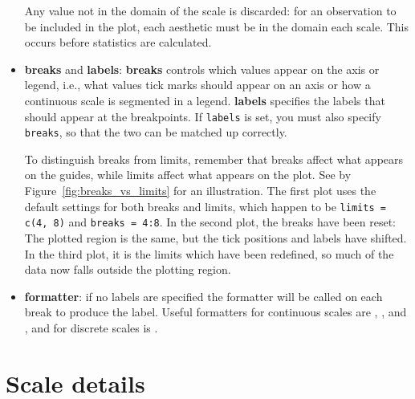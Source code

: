 \begin{itemize}
  Any value not in the domain of the scale is discarded: for an observation to be included in the plot, each aesthetic must be in the domain each scale.  This occurs before statistics are calculated. 
  
  \item {\bf breaks} and {\bf labels}: {\bf breaks} controls which values appear on the axis or legend, i.e., what values tick marks should appear on an axis or how a continuous scale is segmented in a legend. {\bf labels} specifies the labels that should appear at the breakpoints. If {\tt labels} is set, you must also specify {\tt breaks}, so that the two can be matched up correctly.

  To distinguish breaks from limits, remember that breaks affect what appears on the guides, while limits affect what appears on the plot.  See by Figure~\ref{fig:breaks_vs_limits} for an illustration.  The first plot uses the default settings for both breaks and limits, which happen to be {\tt limits = c(4, 8)} and {\tt breaks = 4:8}.  In the second plot, the breaks have been reset: The plotted region is the same, but the tick positions and labels have shifted.  In the third plot, it is the limits which have been redefined, so much of the data now falls outside the plotting region. 
  
    

  \item {\bf formatter}: if no labels are specified the formatter will be called on each break to produce the label.  Useful formatters for continuous scales are , ,  and , and for discrete scales is .

\end{itemize}

\section{Scale details}
\label{sec:scale-details}

